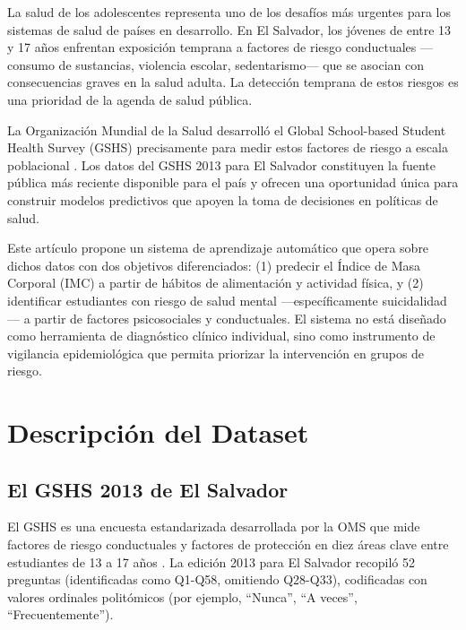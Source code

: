 \documentclass[conference]{IEEEtran}
\begin{document}
La salud de los adolescentes representa uno de los desafíos más urgentes para los sistemas de salud de países en desarrollo. En El Salvador, los jóvenes de entre 13 y 17 años enfrentan exposición temprana a factores de riesgo conductuales ---consumo de sustancias, violencia escolar, sedentarismo--- que se asocian con consecuencias graves en la salud adulta. La detección temprana de estos riesgos es una prioridad de la agenda de salud pública.

La Organización Mundial de la Salud desarrolló el Global School-based Student Health Survey (GSHS) precisamente para medir estos factores de riesgo a escala poblacional \cite{who_gshs_2013}. Los datos del GSHS 2013 para El Salvador constituyen la fuente pública más reciente disponible para el país y ofrecen una oportunidad única para construir modelos predictivos que apoyen la toma de decisiones en políticas de salud.

Este artículo propone un sistema de aprendizaje automático que opera sobre dichos datos con dos objetivos diferenciados: (1) predecir el Índice de Masa Corporal (IMC) a partir de hábitos de alimentación y actividad física, y (2) identificar estudiantes con riesgo de salud mental ---específicamente suicidalidad--- a partir de factores psicosociales y conductuales. El sistema no está diseñado como herramienta de diagnóstico clínico individual, sino como instrumento de vigilancia epidemiológica que permita priorizar la intervención en grupos de riesgo.

\section{Descripción del Dataset}

\subsection{El GSHS 2013 de El Salvador}

El GSHS es una encuesta estandarizada desarrollada por la OMS que mide factores de riesgo conductuales y factores de protección en diez áreas clave entre estudiantes de 13 a 17 años \cite{who_gshs_2013}. La edición 2013 para El Salvador recopiló 52 preguntas (identificadas como Q1-Q58, omitiendo Q28-Q33), codificadas con valores ordinales politómicos (por ejemplo, ``Nunca'', ``A veces'', ``Frecuentemente'').
\end{document}
